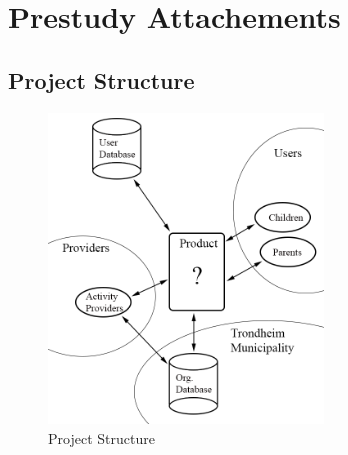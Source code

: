 \chapter{Prestudy Attachements}

\section{Project Structure}
\label{project_structure}

\begin{figure}[H]
\centering
    \includegraphics[width=0.65\textwidth]{fig/arkitektur.png}
\caption{Project Structure}
\label{Project_Structure_Diagram}
\end{figure}

\clearpage